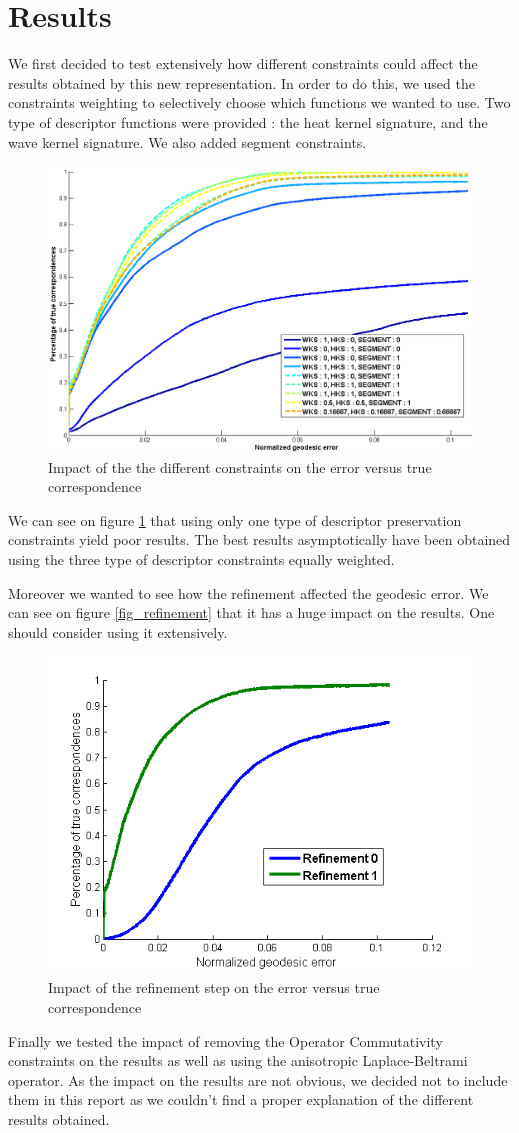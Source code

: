 \documentclass[10pt,twocolumn,letterpaper]{article}
\begin{document}
\section{Results} %
We first decided to test extensively how different constraints could affect the results obtained by this new representation. In order to do this, we used the constraints weighting to selectively choose which functions we wanted to use. Two type of descriptor functions were provided : the heat kernel signature, and the wave kernel signature. We also added segment constraints.

\begin{figure}[h]
\centering
\includegraphics[width=.4\textwidth]{Images/weights.png}
\caption{Impact of the the different constraints on the error versus true correspondence}
\label{fig_weights}
\end{figure}

We can see on figure \ref{fig_weights} that using only one type of descriptor preservation constraints yield poor results. The best results asymptotically have been obtained using the three type of descriptor constraints equally weighted.

Moreover we wanted to see how the refinement affected the geodesic error. We can see on figure \ref{fig_refinement} that it has a huge impact on the results. One should consider using it extensively.

\begin{figure}[h]
\centering
\includegraphics[width=.4\textwidth]{Images/refinement.png}
\caption{Impact of the refinement step on the error versus true correspondence}
\label{refinement}
\end{figure}

Finally we tested the impact of removing the Operator Commutativity constraints on the results as well as using the anisotropic Laplace-Beltrami operator. As the impact on the results are not obvious, we decided not to include them in this report as we couldn't find a proper explanation of the different results obtained.
 
\end{document}
